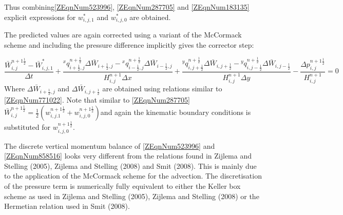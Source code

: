 \documentclass{article}
\begin{document}
\noindent Thus combining\eqref{ZEqnNum523996}, \eqref{ZEqnNum287705} and \eqref{ZEqnNum183135} explicit expressions for $w_{i,j,1}^{*} $ and $w_{i,j,0}^{*} $ are obtained. 

\noindent The predicted values are again corrected using a variant of the McCormack scheme and including the pressure difference implicitly gives the corrector step:

\noindent 
\begin{equation} \label{ZEqnNum858516} 
\frac{\bar{W}_{i,j}^{n+1{\tfrac{1}{2}} } -\bar{W}_{i,j,1}^{*} }{\Delta t} +\frac{{}^{x} q_{i+{\tfrac{1}{2}} ,j}^{n+{\tfrac{1}{2}} } \Delta \bar{W}_{i+{\tfrac{1}{2}} ,j}^{} -{}^{x} q_{i-{\tfrac{1}{2}} ,j}^{n+{\tfrac{1}{2}} } \Delta \bar{W}_{i-{\tfrac{1}{2}} ,j}^{} }{H_{i,j}^{n+1} \Delta x} +\frac{{}^{y} q_{i,j+{\tfrac{1}{2}} }^{n+{\tfrac{1}{2}} } \Delta \bar{W}_{i,j+{\tfrac{1}{2}} }^{} -{}^{y} q_{i,j-{\tfrac{1}{2}} }^{n+{\tfrac{1}{2}} } \Delta \bar{W}_{i,j-{\tfrac{1}{2}} }^{} }{H_{i,j}^{n+1} \Delta y} -\frac{\Delta p_{i,j}^{n+1{\tfrac{1}{2}} } }{H_{i,j}^{n+1} } =0 
\end{equation} 
Where $\Delta \bar{W}_{i+{\tfrac{1}{2}} ,j}^{} $ and $\Delta \bar{W}_{i,j+{\tfrac{1}{2}} }^{} $ are obtained using relations similar to \eqref{ZEqnNum771022}. Note that similar to \eqref{ZEqnNum287705}  $\bar{W}_{i,j}^{n+1{\tfrac{1}{2}} } ={\tfrac{1}{2}} \left(w_{i,j.1}^{n+1{\tfrac{1}{2}} } +w_{i,j,0}^{n+1{\tfrac{1}{2}} } \right)$and again the kinematic boundary conditions is substituted for $w_{i,j,0}^{n+1{\tfrac{1}{2}} } $.

\noindent 

\noindent The discrete vertical momentum balance of \eqref{ZEqnNum523996} and \eqref{ZEqnNum858516} looks very different from the relations found in Zijlema and Stelling (2005), Zijlema and Stelling (2008)  and Smit (2008). This is mainly due to the application of the McCormack scheme for the advection. The discretisation of the pressure term is numerically fully equivalent to either the Keller box scheme as used in Zijlema and Stelling (2005), Zijlema and Stelling (2008) or the Hermetian relation used in Smit (2008).

\noindent 
\end{document}
